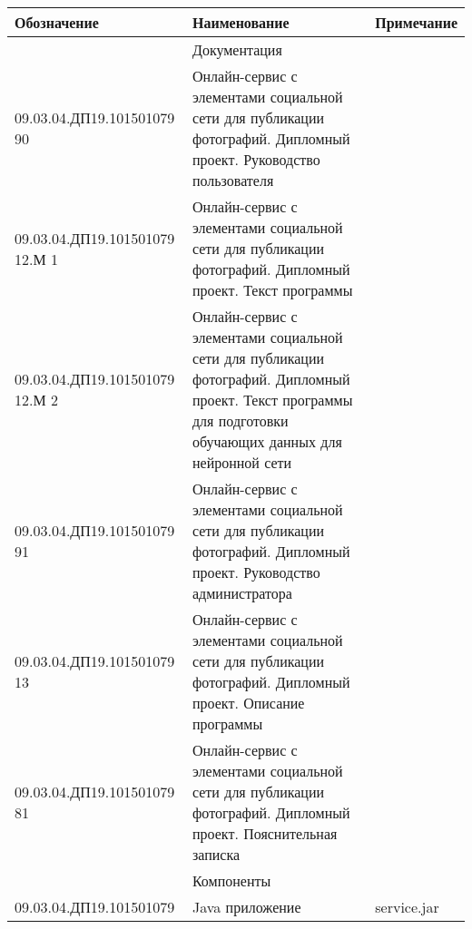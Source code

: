 \begin{table}[H]
  \begin{tabular}{|p{5.5cm}|p{8cm}|p{2.5cm}|}
  \hline Обозначение & Наименование & Примечание \\
  \hline  & Документация &  \\
  \hline 09.03.04.ДП19.101501079 90 & Онлайн-сервис с элементами социальной сети для публикации фотографий. Дипломный проект. Руководство пользователя & \\
  \hline 09.03.04.ДП19.101501079 12.М 1 & Онлайн-сервис с элементами социальной сети для публикации фотографий. Дипломный проект. Текст программы & \\
  \hline 09.03.04.ДП19.101501079 12.М 2 & Онлайн-сервис с элементами социальной сети для публикации фотографий. Дипломный проект. Текст программы для подготовки обучающих данных для нейронной сети & \\
  \hline 09.03.04.ДП19.101501079 91 & Онлайн-сервис с элементами социальной сети для публикации фотографий. Дипломный проект. Руководство администратора & \\
  \hline 09.03.04.ДП19.101501079 13 & Онлайн-сервис с элементами социальной сети для публикации фотографий. Дипломный проект. Описание программы & \\
  \hline 09.03.04.ДП19.101501079 81 & Онлайн-сервис с элементами социальной сети для публикации фотографий. Дипломный проект. Пояснительная записка & \\
  \hline  & Компоненты &  \\
  \hline 09.03.04.ДП19.101501079 & Java приложение & service.jar \\
  \hline 
  \end{tabular}
\end{table}